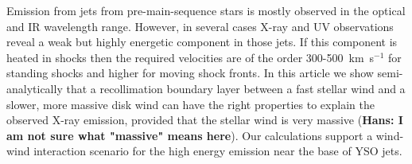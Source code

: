 Emission from jets from pre-main-sequence stars is mostly observed in the optical and IR wavelength range. However, in several cases X-ray and UV observations reveal a weak but highly energetic component in those jets. If this component is heated in shocks then the required velocities are of the order 300-500~km~s$^{-1}$ for standing shocks and higher for moving shock fronts. In this article we show semi-analytically that a recollimation boundary layer between a fast stellar wind and a slower, more massive disk wind can have the right properties to explain the observed X-ray emission, provided that the stellar wind is very massive ({\bf Hans: I am not sure what "massive" means here}). Our calculations support a wind-wind interaction scenario for the high energy emission near the base of YSO jets. 
